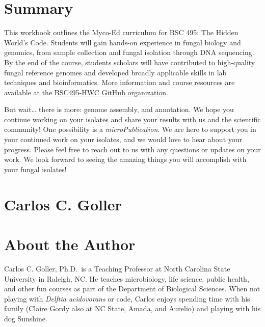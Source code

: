 \documentclass[
  letterpaper,
  DIV=11,
  numbers=noendperiod]{scrreprt}
\begin{document}

\chapter*{Summary}\label{summary}


This workbook outlines the Myco-Ed curriculum for BSC 495: The Hidden
World's Code. Students will gain hands-on experience in fungal biology
and genomics, from sample collection and fungal isolation through DNA
sequencing. By the end of the course, students scholars will have
contributed to high-quality fungal reference genomes and developed
broadly applicable skills in lab techniques and bioinformatics. More
information and course resources are available at the
\href{https://github.com/BSC495-HWC}{BSC495-HWC GitHub organization}.

But wait\ldots{} there is more: genome assembly, and annotation. We hope
you continue working on your isolates and share your results with us and
the scientific community! One possibility is a \emph{microPublication}.
We are here to support you in your continued work on your isolates, and
we would love to hear about your progress. Please feel free to reach out
to us with any questions or updates on your work. We look forward to
seeing the amazing things you will accomplish with your fungal isolates!


\chapter{Carlos C. Goller}\label{carlos-c.-goller}


\chapter*{About the Author}\label{about-the-author}


Carlos C. Goller, Ph.D.~is a Teaching Professor at North Carolina State
University in Raleigh, NC. He teaches microbiology, life science, public
health, and other fun courses as part of the Department of Biological
Sciences. When not playing with \emph{Delftia acidovorans} or code,
Carlos enjoys spending time with his family (Claire Gordy also at NC
State, Amada, and Aurelio) and playing with his dog Sunshine.
\end{document}
